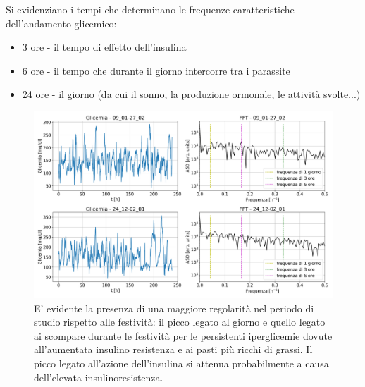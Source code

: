 \documentclass{article}
\begin{document}
        Si evidenziano i tempi che determinano le frequenze caratteristiche dell'andamento glicemico:
            \begin{itemize}
                \item 3 ore - il tempo di effetto dell'insulina
                \item 6 ore - il tempo che durante il giorno intercorre tra i parassite
                \item 24 ore - il giorno (da cui il sonno, la produzione ormonale, le attività
                svolte...)
            \end{itemize}
            \begin{figure}[H]
                \centering
                \includegraphics[width=\textwidth]{rubbish/rubbish.png}
                \caption{E' evidente la presenza di una maggiore regolarità nel 
                periodo di studio rispetto alle festività: il picco legato
                al giorno e quello legato ai scompare durante le festività 
                per le persistenti iperglicemie dovute all'aumentata insulino
                resistenza e ai pasti più ricchi di grassi.
                Il picco legato all'azione dell'insulina si attenua probabilmente
                a causa dell'elevata insulinoresistenza.}
                \label{fig:rubbish}
            \end{figure} 
\end{document}
